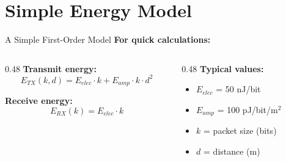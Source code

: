 \documentclass[aspectratio=169,11pt]{beamer}
\begin{document}
\section{Simple Energy Model}

\begin{frame}{A Simple First-Order Model}
    \textbf{For quick calculations:}
    
    \vspace{0.3cm}
    \begin{columns}[T]
        \begin{column}{0.48\textwidth}
            \textbf{Transmit energy:}
            \[
            E_{TX}(k,d) = E_{elec} \cdot k + E_{amp} \cdot k \cdot d^2
            \]
            
            \textbf{Receive energy:}
            \[
            E_{RX}(k) = E_{elec} \cdot k
            \]
        \end{column}
        \begin{column}{0.48\textwidth}
            \textbf{Typical values:}
            \begin{itemize}
                \item $E_{elec}$ = 50 nJ/bit
                \item $E_{amp}$ = 100 pJ/bit/m$^2$
                \item $k$ = packet size (bits)
                \item $d$ = distance (m)
            \end{itemize}
        \end{column}
    \end{columns}
    
    \vspace{0.3cm}
    \begin{center}
    \end{center}
\end{frame}
\end{document}
